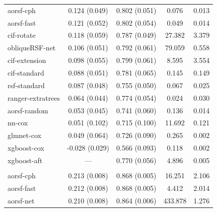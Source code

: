\documentclass[twoside,11pt]{article}\usepackage[]{graphicx}\usepackage[]{xcolor}
\newenvironment{knitrout}{}{} %
\begin{document}
\begin{knitrout}
\begin{longtable}[t]{lcccc}
\hspace{1em}aorsf-cph & 0.124 (0.049) & 0.802 (0.051) & 0.076 & 0.013\\
\hspace{1em}aorsf-fast & 0.121 (0.052) & 0.802 (0.054) & 0.049 & 0.014\\
\hspace{1em}cif-rotate & 0.118 (0.059) & 0.787 (0.049) & 27.382 & 3.379\\
\hspace{1em}obliqueRSF-net & 0.106 (0.051) & 0.792 (0.061) & 79.059 & 0.558\\
\hspace{1em}cif-extension & 0.098 (0.055) & 0.799 (0.061) & 8.595 & 3.554\\
\hspace{1em}cif-standard & 0.088 (0.051) & 0.781 (0.065) & 0.145 & 0.149\\
\hspace{1em}rsf-standard & 0.087 (0.048) & 0.755 (0.050) & 0.067 & 0.025\\
\hspace{1em}ranger-extratrees & 0.064 (0.044) & 0.774 (0.054) & 0.024 & 0.030\\
\hspace{1em}aorsf-random & 0.053 (0.045) & 0.741 (0.060) & 0.136 & 0.014\\
\hspace{1em}nn-cox & 0.051 (0.102) & 0.715 (0.100) & 11.692 & 0.121\\
\hspace{1em}glmnet-cox & 0.049 (0.064) & 0.726 (0.090) & 0.265 & 0.002\\
\hspace{1em}xgboost-cox & -0.028 (0.029) & 0.566 (0.093) & 0.118 & 0.002\\
\hspace{1em}xgboost-aft & --- & 0.770 (0.056) & 4.896 & 0.005\\
\addlinespace[0.3em]
\multicolumn{5}{l}{\textit{\textbf{Non-alcohol fatty liver disease; death, n = 17549, p = 24}}}\\
\hline
\hspace{1em}aorsf-cph & 0.213 (0.008) & 0.868 (0.005) & 16.251 & 2.106\\
\hspace{1em}aorsf-fast & 0.212 (0.008) & 0.868 (0.005) & 4.412 & 2.014\\
\hspace{1em}aorsf-net & 0.210 (0.008) & 0.864 (0.006) & 433.878 & 1.276\\

\end{longtable}
\end{knitrout}
\end{document}
